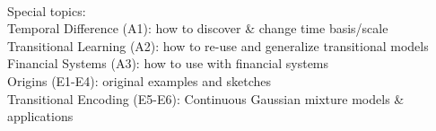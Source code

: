{\ }\\

Special topics:\\

 
\noindent\hspace*{1cm}Temporal Difference (A1): how to discover \& change time basis/scale\\
\hspace*{1cm}Transitional Learning (A2): how to re-use and generalize transitional models\\
\hspace*{1cm}Financial Systems (A3): how to use with financial systems\\
\hspace*{1cm}Origins (E1-E4): original examples and sketches\\
\hspace*{1cm}Transitional Encoding (E5-E6): Continuous Gaussian mixture models \& applications
 

 
